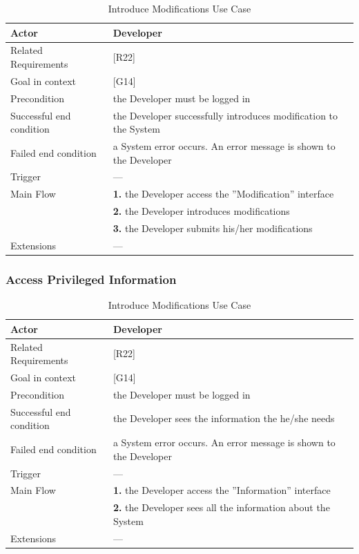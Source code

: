 \begin{table}[htbp]
\begin{center}
\begin{tabular}[t]{p{}p{}}

\hline
Actor & Developer \\
\hline
Related Requirements & [R22] \\
\hline
Goal in context & [G14] \\
\hline
Precondition & the Developer must be logged in \\
\hline
Successful end condition & the Developer successfully introduces modification to the System \\
\hline
Failed end condition & a System error occurs. An error message is shown to the Developer  \\
\hline
Trigger & --- \\
\hline
Main Flow & \textbf{1.} the Developer access the ''Modification'' interface \\
& \textbf{2.} the Developer introduces modifications \\
& \textbf{3.} the Developer submits his/her modifications \\
\hline
Extensions & --- \\
\hline

\end{tabular}
\end{center}
\caption{Introduce Modifications Use Case}
\end{table}
\clearpage

\subsubsection{Access Privileged Information}

\begin{table}[htbp]
\begin{center}
\begin{tabular}[t]{p{}p{}}

\hline
Actor & Developer \\
\hline
Related Requirements & [R22] \\
\hline
Goal in context & [G14] \\
\hline
Precondition & the Developer must be logged in \\
\hline
Successful end condition & the Developer sees the information the he/she needs \\
\hline
Failed end condition & a System error occurs. An error message is shown to the Developer  \\
\hline
Trigger & --- \\
\hline
Main Flow & \textbf{1.} the Developer access the ''Information'' interface \\
& \textbf{2.} the Developer sees all the information about the System \\
\hline
Extensions & --- \\
\hline

\end{tabular}
\end{center}
\caption{Introduce Modifications Use Case}
\end{table}
\clearpage


